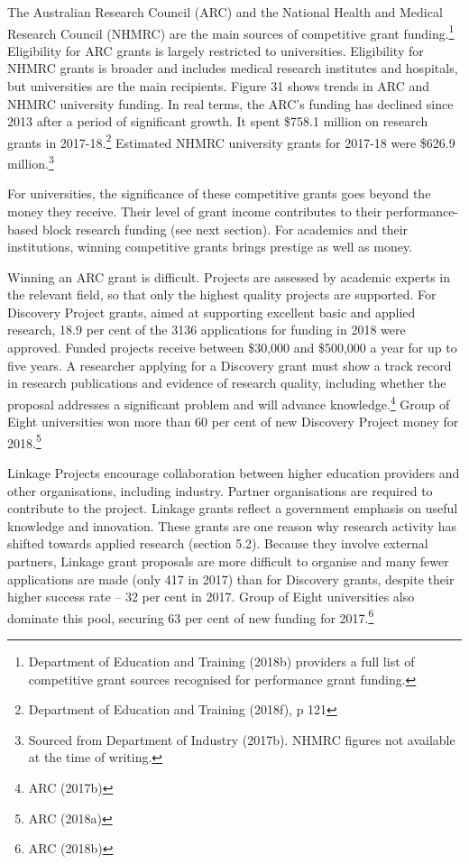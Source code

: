 \documentclass[]{book}
\begin{document}
The Australian Research Council (ARC) and the National Health and Medical Research Council (NHMRC) are the main sources of competitive grant funding.\footnote{Department of Education and Training (2018b) providers a full list of competitive grant sources recognised for performance grant funding.} Eligibility for ARC grants is largely restricted to universities. Eligibility for NHMRC grants is broader and includes medical research institutes and hospitals, but universities are the main recipients. Figure 31 shows trends in ARC and NHMRC university funding. In real terms, the ARC's funding has declined since 2013 after a period of significant growth. It spent \$758.1 million on research grants in 2017-18.\footnote{Department of Education and Training (2018f), p 121} Estimated NHMRC university grants for 2017-18 were \$626.9 million.\footnote{Sourced from Department of Industry (2017b). NHMRC figures not available at the time of writing.}

For universities, the significance of these competitive grants goes beyond the money they receive. Their level of grant income contributes to their performance-based block research funding (see next section). For academics and their institutions, winning competitive grants brings prestige as well as money.

Winning an ARC grant is difficult. Projects are assessed by academic experts in the relevant field, so that only the highest quality projects are supported. For Discovery Project grants, aimed at supporting excellent basic and applied research, 18.9 per cent of the 3136 applications for funding in 2018 were approved. Funded projects receive between \$30,000 and \$500,000 a year for up to five years. A researcher applying for a Discovery grant must show a track record in research publications and evidence of research quality, including whether the proposal addresses a significant problem and will advance knowledge.\footnote{ARC (2017b)} Group of Eight universities won more than 60 per cent of new Discovery Project money for 2018.\footnote{ARC (2018a)}

Linkage Projects encourage collaboration between higher education providers and other organisations, including industry. Partner organisations are required to contribute to the project. Linkage grants reflect a government emphasis on useful knowledge and innovation. These grants are one reason why research activity has shifted towards applied research (section 5.2). Because they involve external partners, Linkage grant proposals are more difficult to organise and many fewer applications are made (only 417 in 2017) than for Discovery grants, despite their higher success rate -- 32 per cent in 2017. Group of Eight universities also dominate this pool, securing 63 per cent of new funding for 2017.\footnote{ARC (2018b)}
\end{document}
